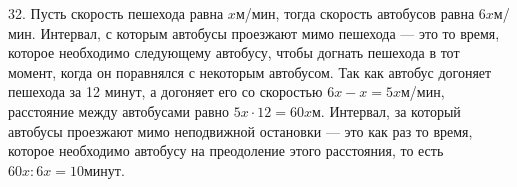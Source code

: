 32. Пусть скорость пешехода равна $x$м/мин, тогда скорость автобусов равна $6x$м/мин. Интервал, с которым автобусы проезжают мимо пешехода --- это то время, которое необходимо следующему автобусу, чтобы догнать пешехода в тот момент, когда он поравнялся с некоторым автобусом. Так как автобус догоняет пешехода за 12 минут, а догоняет его со скоростью $6x-x=5x$м/мин, расстояние между автобусами равно $5x\cdot12=60x$м. Интервал, за который автобусы проезжают мимо неподвижной остановки --- это как раз то время, которое необходимо автобусу на преодоление этого расстояния, то есть $60x:6x=10$минут.\\
